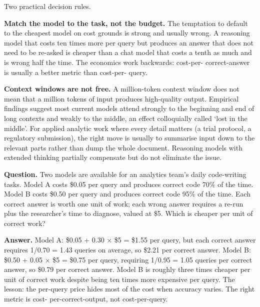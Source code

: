 \documentclass[
  letterpaper,
  11pt]{scrbook}
\begin{document}
Two practical decision rules.

\textbf{Match the model to the task, not the budget.} The temptation to
default to the cheapest model on cost grounds is strong and usually
wrong. A reasoning model that costs ten times more per query but
produces an answer that does not need to be re-asked is cheaper than a
chat model that costs a tenth as much and is wrong half the time. The
economics work backwards: cost-per- correct-answer is usually a better
metric than cost-per- query.

\textbf{Context windows are not free.} A million-token context window
does not mean that a million tokens of input produces high-quality
output. Empirical findings suggest most current models attend strongly
to the beginning and end of long contexts and weakly to the middle, an
effect colloquially called `lost in the middle'. For applied analytic
work where every detail matters (a trial protocol, a regulatory
submission), the right move is usually to summarise input down to the
relevant parts rather than dump the whole document. Reasoning models
with extended thinking partially compensate but do not eliminate the
issue.

\begin{tcolorbox}[enhanced jigsaw, arc=.35mm, bottomrule=.15mm, bottomtitle=1mm, breakable, colback=white, colbacktitle=quarto-callout-note-color!10!white, colframe=quarto-callout-note-color-frame, coltitle=black, left=2mm, leftrule=.75mm, opacityback=0, opacitybacktitle=0.6, rightrule=.15mm, title={Check your understanding: cost per correct answer}, titlerule=0mm, toprule=.15mm, toptitle=1mm]

\textbf{Question.} Two models are available for an analytics team's
daily code-writing tasks. Model A costs \$0.05 per query and produces
correct code 70\% of the time. Model B costs \$0.50 per query and
produces correct code 95\% of the time. Each correct answer is worth one
unit of work; each wrong answer requires a re-run plus the researcher's
time to diagnose, valued at \$5. Which is cheaper per unit of correct
work?

\textbf{Answer.} Model A: \$0.05 + 0.30 × \$5 = \$1.55 per query, but
each correct answer requires 1/0.70 = 1.43 queries on average, so \$2.21
per correct answer. Model B: \$0.50 + 0.05 × \$5 = \$0.75 per query,
requiring 1/0.95 = 1.05 queries per correct answer, so \$0.79 per
correct answer. Model B is roughly three times cheaper per unit of
correct work despite being ten times more expensive per query. The
lesson: the per-query price hides most of the cost when accuracy varies.
The right metric is cost- per-correct-output, not cost-per-query.

\end{tcolorbox}
\end{document}
